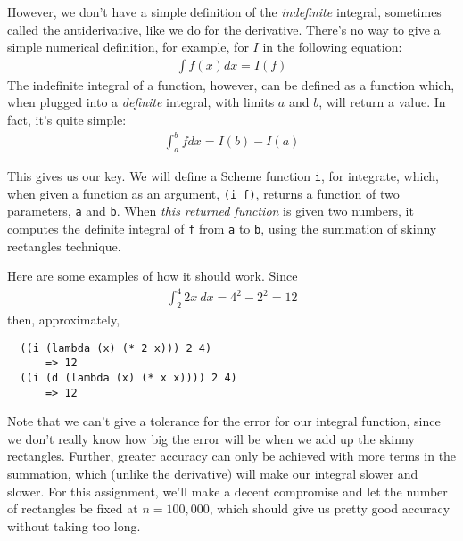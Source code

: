 \documentclass{article}
\begin{document}
\begin{multicols}{2}
However, we don't have a simple definition of the {\em indefinite}
integral, sometimes called the antiderivative, like we do for the
derivative.  There's no way to give a simple numerical definition, for
example, for $I$ in the following equation:
\begin{eqnarray}
\int f(x) dx = I(f)
\end{eqnarray}
The indefinite integral of a function,
however, can be defined as a function which, when plugged into a {\em
  definite} integral, with limits $a$ and $b$, will return a value.
In fact, it's quite simple:
\begin{eqnarray}
\int_a^b f dx  =  I(b) - I(a)
\end{eqnarray}

This gives us our key.  We will define a Scheme function {\tt i}, for
integrate, which, when given a function as an argument, {\tt (i f)},
returns a function of two parameters, {\tt a} and {\tt b}.  When
{\em this returned function} is given two numbers, it computes the definite
integral of {\tt f} from {\tt a} to {\tt b}, using the summation of
skinny rectangles technique.

Here are some examples of how it should work.  Since
\begin{eqnarray}
  \int_2^4 2x\ dx = 4^2 - 2^2 = 12
\end{eqnarray}
then, approximately,
\begin{Verbatim}
  ((i (lambda (x) (* 2 x))) 2 4)
      => 12
  ((i (d (lambda (x) (* x x)))) 2 4)
      => 12
\end{Verbatim}

Note that we can't give a tolerance for the error for our integral
function, since we don't really know how big the error will be when we
add up the skinny rectangles.  Further, greater accuracy can only be
achieved with more terms in the summation, which (unlike the
derivative) will make our integral slower and slower.  For this
assignment, we'll make a decent compromise and let the number of
rectangles be fixed at $n=100,000$, which should give us pretty good
accuracy without taking too long.

\end{multicols}
\end{document}
